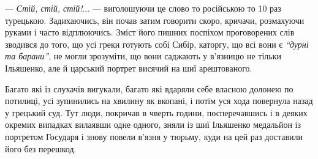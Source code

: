 \documentclass[a4paper,20pt]{report}
\begin{document}

— \emph{Стій, стій, стій!}... — виголошуючи це слово то російською то 10 раз
турецькою. Задихаючись, він почав затим говорити скоро, кричачи, розмахуючи
руками і часто відплюючись. Зміст його пишних поспіхом проговорених слів
зводився до того, що усі греки готують собі Сибір, каторгу, що всі вони є
\emph{``дурні та барани''}, не могли зрозуміти, що вони саджають у в'язницю не
тільки Ільяшенко, але й царський портрет висячий на шиї арештованого. 

Багато які із слухачів вигукали, багато які вдаряли себе власною долонею по
потилиці, усі зупинились на хвилину як вкопані, і потім уся хода повернула
назад у грецький суд. Тут люди, покричав в чверть години, посперечавшись і в
деяких окремих випадках вилаявши одне одного, зняли із шиї Ільяшенко медальйон
із портретом Государя і знову повели в'язня у тюрьму, куди на цей раз доставили
його без перешкод.
\end{document}

